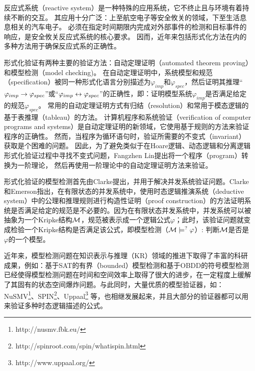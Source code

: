反应式系统（reactive system）是一种特殊的应用系统，它不终止且与环境有着持续不断的交互。
其应用十分广泛：上至航空电子等安全攸关的领域，下至生活息息相关的汽车电子。
必须在指定时间期限内完成对外部事件的检测和目标事件的响应，是安全攸关反应式系统的核心要求。
因而，近年来包括形式化方法在内的多种方法用于确保反应式系的正确性。


形式化验证有两种主要的验证方法：自动定理证明（automated theorem proving）和模型检测（model checking)。
在自动定理证明中，系统模型和规范（specification）被同一种形式化语言分别描述为$\varphi_{imp}$和$\varphi_{spec}$，然后证明其推理“$\varphi_{imp}\rightarrow \varphi_{spec}$”或“$\varphi_{imp}\leftrightarrow\varphi_{spec}$”的正确性，即：证明模型系统$\varphi_{imp}$是否满足给定的规范$\varphi_{spec}$。
常用的自动定理证明方式有归结（resolution）\cite{DBLP:journals/jacm/Robinson65}和常用于模态逻辑的基于表推理（tableau）\cite{hughes1996new}的方法。
计算机程序和系统验证（verification of computer programs and systems）是自动定理证明的新领域，它使用基于规则的方法来验证程序的正确性。
然而，当程序为循环语句时，验证所需要的不变式（invariant）获取是个困难的问题。
因此，为了避免类似于在Hoare逻辑\cite{Hoare1969}、动态逻辑\cite{harel1979first}和分离逻辑\cite{DBLP:conf/lics/Reynolds02}形式化验证过程中寻找不变式问题，Fangzhen Lin提出将一个程序（program）转换为一阶理论，
然后再使用一阶理论中的自动定理证明方法来验证\cite{DBLP:journals/ai/Lin16}。

形式化验证的模型检测首先由Clarke提出，并用于解决并发系统验证问题\cite{DBLP:conf/spin/Clarke08}。Clarke和Emerson指出，在有限状态的并发系统中，使用时态逻辑推演系统（deductive system）中的公理和推理规则进行构造性证明（proof construction）的方法证明系统是否满足给定的规范是不必要的\cite{clarke1981design}。因为在有限状态并发系统中，并发系统可以被抽象为一个Kripke结构${\cal M}$，规范被表示成一个逻辑公式$\varphi$；此时，该验证问题就变成检验一个Kripke结构是否满足该公式，即模型检测（${\cal M}\models^? \varphi$）: 判断${\cal M}$是否是$\varphi$的一个模型。

近年来，模型检测问题在知识表示与推理（KR）领域的推进下取得了丰富的科研成果，例如：基于SAT的有界（bounded）模型检测\cite{DBLP:journals/ac/BiereCCSZ03}和基于OBDD的符号模型检测\cite{burch1992symbolic}已经使得模型检测问题在时间和空间效率上取得了很大的进步，在一定程度上缓解了其固有的状态空间爆炸问题。与此同时，大量优质的模型验证器，如：NuSMV\footnote{http://nusmv.fbk.eu/}、SPIN\footnote{http://spinroot.com/spin/whatispin.html}、Uppaal\footnote{http://www.uppaal.org/} 等，也相继发展起来，并且大部分的验证器都可以用来验证多种时态逻辑描述的公式。  

